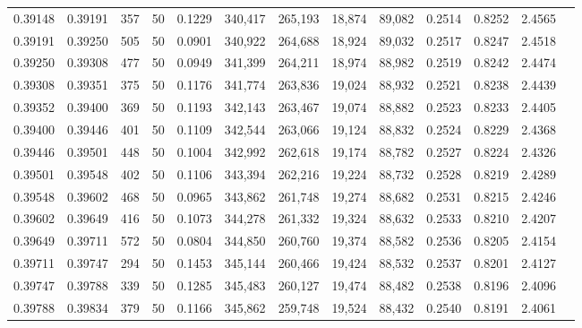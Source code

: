 \begin{tabular}{rrrrrrrrrrrrr}
0.39148 & 0.39191 &   357 &  50 &                                     0.1229 & 340,417 & 265,193 &  18,874 &  89,082 & 0.2514 & 0.8252 & 2.4565 \\
0.39191 & 0.39250 &   505 &  50 &                                     0.0901 & 340,922 & 264,688 &  18,924 &  89,032 & 0.2517 & 0.8247 & 2.4518 \\
0.39250 & 0.39308 &   477 &  50 &                                     0.0949 & 341,399 & 264,211 &  18,974 &  88,982 & 0.2519 & 0.8242 & 2.4474 \\
0.39308 & 0.39351 &   375 &  50 &                                     0.1176 & 341,774 & 263,836 &  19,024 &  88,932 & 0.2521 & 0.8238 & 2.4439 \\
0.39352 & 0.39400 &   369 &  50 &                                     0.1193 & 342,143 & 263,467 &  19,074 &  88,882 & 0.2523 & 0.8233 & 2.4405 \\
0.39400 & 0.39446 &   401 &  50 &                                     0.1109 & 342,544 & 263,066 &  19,124 &  88,832 & 0.2524 & 0.8229 & 2.4368 \\
0.39446 & 0.39501 &   448 &  50 &                                     0.1004 & 342,992 & 262,618 &  19,174 &  88,782 & 0.2527 & 0.8224 & 2.4326 \\
0.39501 & 0.39548 &   402 &  50 &                                     0.1106 & 343,394 & 262,216 &  19,224 &  88,732 & 0.2528 & 0.8219 & 2.4289 \\
0.39548 & 0.39602 &   468 &  50 &                                     0.0965 & 343,862 & 261,748 &  19,274 &  88,682 & 0.2531 & 0.8215 & 2.4246 \\
0.39602 & 0.39649 &   416 &  50 &                                     0.1073 & 344,278 & 261,332 &  19,324 &  88,632 & 0.2533 & 0.8210 & 2.4207 \\
0.39649 & 0.39711 &   572 &  50 &                                     0.0804 & 344,850 & 260,760 &  19,374 &  88,582 & 0.2536 & 0.8205 & 2.4154 \\
0.39711 & 0.39747 &   294 &  50 &                                     0.1453 & 345,144 & 260,466 &  19,424 &  88,532 & 0.2537 & 0.8201 & 2.4127 \\
0.39747 & 0.39788 &   339 &  50 &                                     0.1285 & 345,483 & 260,127 &  19,474 &  88,482 & 0.2538 & 0.8196 & 2.4096 \\
0.39788 & 0.39834 &   379 &  50 &                                     0.1166 & 345,862 & 259,748 &  19,524 &  88,432 & 0.2540 & 0.8191 & 2.4061 \\

\end{tabular}
